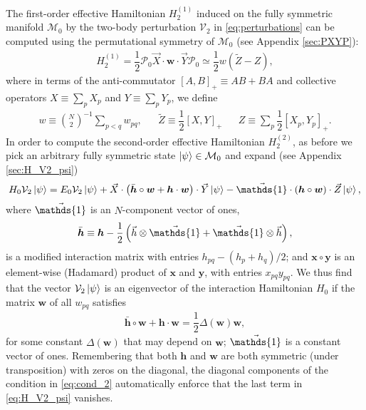 \documentclass[nofootinbib,notitlepage,11pt]{revtex4-2}
\newcommand{\f}[2]{\dfrac{#1}{#2}} %
\newcommand{\p}[1]{\left(#1\right)} %
\renewcommand{\sp}[1]{\left[#1\right]} %
\renewcommand{\c}{\cdot} %
\renewcommand{\oc}{\circ} %
\newcommand{\m}{\bm} %
\renewcommand{\v}{\vec} %
\newcommand{\1}{\mathds{1}}
\newcommand{\M}{\mathcal{M}}
\renewcommand{\P}{\mathcal{P}}
\newcommand{\V}{\mathcal{V}}
\begin{document}
The first-order effective Hamiltonian $H_2^{(1)}$ induced on the fully
symmetric manifold $\M_0$ by the two-body perturbation $\V_2$ in
\eqref{eq:perturbations} can be computed using the permutational
symmetry of $\M_0$ (see Appendix \ref{sec:PXYP}):
\begin{align}
  H_2^{(1)}
  = \f12 \P_0 \v X\c\m w\c\v Y\P_0
  \simeq \f12 w \p{\tilde Z - Z},
\end{align}
where in terms of the anti-commutator $\sp{A,B}_+\equiv AB+BA$ and
collective operators $X\equiv\sum_p X_p$ and $Y\equiv\sum_p Y_p$, we
define
\begin{align}
  w \equiv {N\choose 2}^{-1} \sum_{p<q} w_{pq},
  &&
  \tilde Z \equiv \f12 \sp{X,Y}_+
  &&
  Z \equiv \sum_p \f12 \sp{X_p, Y_p}_+.
\end{align}
In order to compute the second-order effective Hamiltonian
$H_2^{(2)}$, as before we pick an arbitrary fully symmetric state
$\ket\psi\in\M_0$ and expand (see Appendix \ref{sec:H_V2_psi})
\begin{align}
  H_0 \V_2 \ket\psi
  = E_0 \V_2 \ket\psi
  + \v X \c \p{\bar{\m h}\oc\m w + \m h\c\m w} \c \v Y \ket\psi
  - \v\1 \c \p{\m h\oc\m w} \c \v Z \ket\psi,
  \label{eq:H_V2_psi}
\end{align}
where $\v\1$ is an $N$-component vector of ones,
\begin{align}
  \bar{\m h}
  \equiv \m h - \f12\p{\v h\otimes\v\1 + \v\1\otimes\v h},
\end{align}
is a modified interaction matrix with entries $h_{pq}-\p{h_p+h_q}/2$;
and $\m x\oc\m y$ is an element-wise (Hadamard) product of $\m x$ and
$\m y$, with entries $x_{pq}y_{pq}$.  We thus find that the vector
$\V_2\ket\psi$ is an eigenvector of the interaction Hamiltonian $H_0$
if the matrix $\m w$ of all $w_{pq}$ satisfies
\begin{align}
  \bar{\m h}\oc\m w + \m h\c\m w = \f12 \Delta\p{\m w} \m w,
  \label{eq:cond_2}
\end{align}
for some constant $\Delta\p{\m w}$ that may depend on $\m w$; $\v\1$
is a constant vector of ones.  Remembering that both $\m h$ and $\m w$
are both symmetric (under transposition) with zeros on the diagonal,
the diagonal components of the condition in \eqref{eq:cond_2}
automatically enforce that the last term in \eqref{eq:H_V2_psi}
vanishes.
\end{document}
